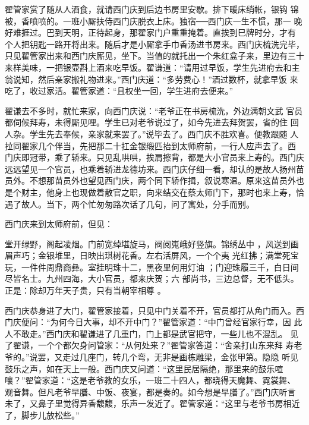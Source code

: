 翟管家赏了随从人酒食，就请西门庆到后边书房里安歇。排下暖床绡帐，银钩
锦被，香喷喷的。一班小厮扶侍西门庆脱衣上床。独宿──西门庆一生不惯，那一
晚好难捱过。巴到天明，正待起身，那翟家门户重重掩着。直挨到巳牌时分，才有
个人把钥匙一路开将出来。随后才是小厮拿手巾香汤进书房来。西门庆梳洗完毕，
只见翟管家出来和西门庆厮见，坐下。当值的就托出一个朱红盒子来，里边有三十
来样美味，一把银壶斟上酒来吃早饭。翟谦道：“请用过早饭，学生先进府去和主
翁说知，然后亲家搬礼物进来。”西门庆道：“多劳费心！”酒过数杯，就拿早饭
来吃了，收过家活。翟管家道：“且权坐一回，学生进府去便来。”

翟谦去不多时，就忙来家，向西门庆说：“老爷正在书房梳洗，外边满朝文武
官员都伺候拜寿，未得厮见哩。学生已对老爷说过了，如今先进去拜贺罢，省的住
回人杂。学生先去奉候，亲家就来罢了。”说毕去了。西门庆不胜欢喜。便教跟随
人拉同翟家几个伴当，先把那二十扛金银缎匹抬到太师府前，一行人应声去了。西
门庆即冠带，乘了轿来。只见乱哄哄，挨肩擦背，都是大小官员来上寿的。西门庆
远远望见一个官员，也乘着轿进龙德坊来。西门庆仔细一看，却认的是故人扬州苗
员外。不想那苗员外也望见西门庆，两个同下轿作揖，叙说寒温。原来这苗员外也
是个财主，他身上也现做着散官之职，向来结交在蔡太师门下，那时也来上寿，恰
遇了故人。当下，两个忙匆匆路次话了几句，问了寓处，分手而别。

西门庆来到太师府前，但见：

堂开绿野，阁起凌烟。门前宽绰堪旋马，阀阅嵬峨好竖旗。锦绣丛中
，风送到画眉声巧；金银堆里，日映出琪树花香。左右活屏风，一个个夷
光红拂；满堂死宝玩，一件件周鼎商彝。室挂明珠十二，黑夜里何用灯油
；门迎珠履三千，白日间尽皆名士。九州四海，大小官员，都来庆贺；六
部尚书，三边总督，无不低头。正是：除却万年天子贵，只有当朝宰相尊
。

西门庆恭身进了大门，翟管家接着，只见中门关着不开，官员都打从角门而入。西
门庆便问：“为何今日大事，却不开中门？”翟管家道：“中门曾经官家行幸，因
此人不敢走。”西门庆和翟谦进了几重门，门上都是武官把守，一些儿也不混乱。
见了翟谦，一个个都欠身问管家：“从何处来？”翟管家答道：“舍亲打山东来拜
寿老爷的。”说罢，又走过几座门，转几个弯，无非是画栋雕梁，金张甲第。隐隐
听见鼓乐之声，如在天上一般。西门庆又问道：“这里民居隔绝，那里来的鼓乐喧
嚷？”翟管家道：“这是老爷教的女乐，一班二十四人，都晓得天魔舞、霓裳舞、
观音舞。但凡老爷早膳、中饭、夜宴，都是奏的。如今想是早膳了。”西门庆听言
未了，又鼻子里觉得异香馥馥，乐声一发近了。翟管家道：“这里与老爷书房相近
了，脚步儿放松些。”

